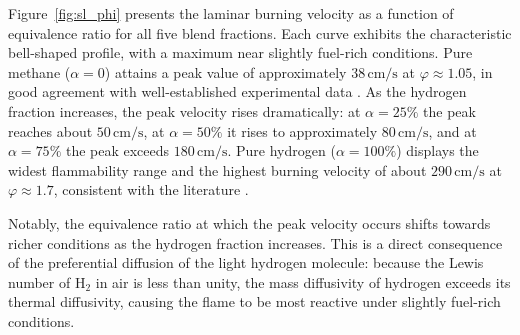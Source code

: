 \documentclass[12pt,a4paper]{article}
\newcommand{\phisym}{\varphi}
\newcommand{\alphasym}{\alpha}
\begin{document}
Figure~\ref{fig:sl_phi} presents the laminar burning velocity as a function of equivalence ratio for all five blend fractions. Each curve exhibits the characteristic bell-shaped profile, with a maximum near slightly fuel-rich conditions. Pure methane (\(\alphasym = 0\)) attains a peak value of approximately \(38\,\mathrm{cm/s}\) at \(\phisym \approx 1.05\), in good agreement with well-established experimental data \cite{hassan1998}. As the hydrogen fraction increases, the peak velocity rises dramatically: at \(\alphasym = 25\%\) the peak reaches about \(50\,\mathrm{cm/s}\), at \(\alphasym = 50\%\) it rises to approximately \(80\,\mathrm{cm/s}\), and at \(\alphasym = 75\%\) the peak exceeds \(180\,\mathrm{cm/s}\). Pure hydrogen (\(\alphasym = 100\%\)) displays the widest flammability range and the highest burning velocity of about \(290\,\mathrm{cm/s}\) at \(\phisym \approx 1.7\), consistent with the literature \cite{law2010}.

Notably, the equivalence ratio at which the peak velocity occurs shifts towards richer conditions as the hydrogen fraction increases. This is a direct consequence of the preferential diffusion of the light hydrogen molecule: because the Lewis number of \(\mathrm{H_2}\) in air is less than unity, the mass diffusivity of hydrogen exceeds its thermal diffusivity, causing the flame to be most reactive under slightly fuel-rich conditions.
\end{document}
